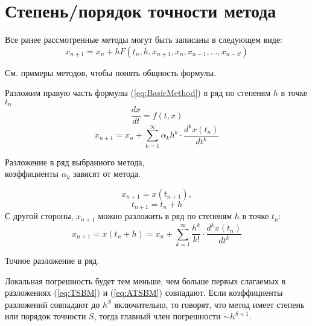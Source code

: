 \documentclass[a4paper,11pt]{article}
\begin{document}
\section{Степень/порядок точности метода\protect\footnotemark}
Все ранее рассмотренные методы могут быть записаны в следующем виде:
\begin{equation}
  \boxed{x_{n+1} = x_n + hF(t_n, h, x_{n+1}, x_n, x_{n-1}, \dots, x_{n-S})}
  \label{eq:BasicMethod}
\end{equation}
\begin{center}
  \small{См. примеры методов, чтобы понять общность формулы.}
\end{center}
Разложим правую часть формулы (\ref{eq:BasicMethod}) в ряд по степеням $h$ в точке $t_n$
\marginpar
{
  \vspace{3mm}
  \[\frac{dx}{dt}=f(t,x)\]
}
\begin{equation}
  \boxed{x_{n+1} = x_n + \sum_{k=1}^{\infty} \alpha_kh^k \cdot \frac{d^kx(t_n)}{dt^k}}
  \label{eq:TSBM}
\end{equation}
\begin{center}
  \small{Разложение в ряд выбранного метода, \\ коэффициенты $\alpha_k$ зависят от метода.}
\end{center}
\marginpar
{
  \vspace{4mm}
  \[x_{n+1} = x(t_{n+1}),\]
  \[t_{n+1}=t_n+h\]
}
С другой стороны, $x_{n+1}$ можно разложить в ряд по степеням $h$ в точке $t_n$:
\begin{equation}
  \boxed{x_{n+1} = x(t_n + h) = x_n + \sum_{k=1}^{\infty} \frac{h^k}{k!} \cdot \frac{d^kx(t_n)}{dt^k}}
  \label{eq:ATSBM}
\end{equation}
\begin{center}
  \small{Точное разложение в ряд.}
\end{center}
Локальная погрешность будет тем меньше, чем больше первых слагаемых в разложениях (\ref{eq:TSBM}) и (\ref{eq:ATSBM}) совпадают.
Если коэффициенты разложений совпадают до $h^S$ включительно, то говорят, что метод имеет степень или порядок точности $S$, тогда главный член погрешности $\sim h^{S+1}$. \\
\end{document}
